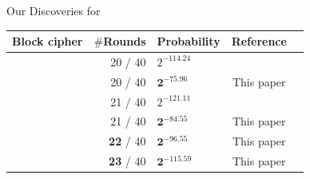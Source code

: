 \documentclass[table,aspectratio=169]{beamer}
\begin{document}
\begin{frame}
{\begin{center}
{{{}
}
}
\end{center}
}
\end{frame}

\begin{frame}{Our Discoveries for }
\begin{table}[hb!] %
\centering
\newcommand{\YY}{\checkmark}
\begin{tabular}{@{}lrlcl}
	\toprule
	Block cipher & $\#$Rounds & Probability & Reference \\
	\midrule
	\multirow{6}{*}{\cipher{WARP}}
	&         20  / 40 & $2^{-114.24}$      & \cite{journals_istr_TehB22} \\
	&         20  / 40 & $\bm{2^{-75.96}}$  & This paper \\
	\cmidrule{2-4}
	&         21  / 40 & $2^{-121.11}$      & \cite{journals_istr_TehB22} \\
	&         21  / 40 & $\bm{2^{-84.55}}$  & This paper \\
	\cmidrule{2-4}
	& \textbf{22} / 40 & $\bm{2^{-96.55}}$  & This paper \\
	& \textbf{23} / 40 & $\bm{2^{-115.59}}$ & This paper \\
	\bottomrule
\end{tabular}
\end{table}%

\end{frame}
\end{document}
